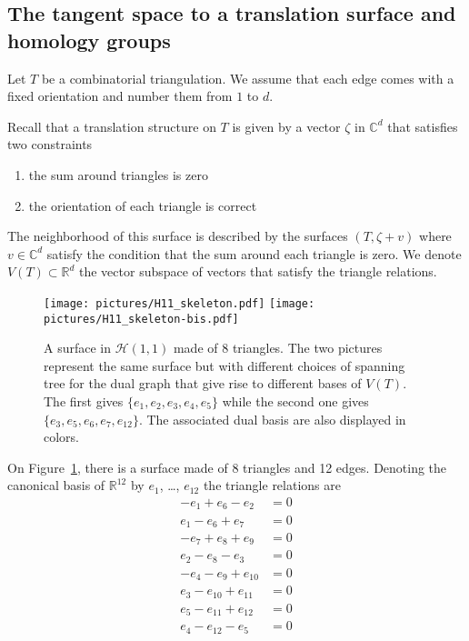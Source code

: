 \documentclass[a4paper,12pt]{article}
\def\bC{\mathbb{C}}
\def\bR{\mathbb{R}}
\def\cH{\mathcal{H}}
\begin{document}
\subsection{The tangent space to a translation surface and homology groups}
Let $T$ be a combinatorial triangulation. We assume that each edge comes with
a fixed orientation and number them from $1$ to $d$.

Recall that a translation structure on $T$ is given by a vector $\zeta$
in $\bC^d$ that satisfies two constraints
\begin{enumerate}
\item the sum around triangles is zero
\item the orientation of each triangle is correct
\end{enumerate}
The neighborhood of this surface is described by the surfaces $(T, \zeta + v)$
where $v \in \bC^d$ satisfy the condition that the sum around each triangle is
zero. We denote $V(T) \subset \bR^d$ the vector subspace of vectors that
satisfy the triangle relations.

\begin{figure}[!ht]
\begin{center}%
\texttt{[image: pictures/H11\_skeleton.pdf]}%
\hspace{1cm}%
\texttt{[image: pictures/H11\_skeleton-bis.pdf]}%
\end{center}
\caption{A surface in $\cH(1,1)$ made of 8 triangles. The two pictures represent the
same surface but with different choices of spanning tree for the dual graph that
give rise to different bases of $V(T)$. The first gives $\{e_1, e_2, e_3, e_4, e_5\}$
while the second one gives $\{e_3, e_5, e_6, e_7, e_{12}\}$. The associated dual basis
are also displayed in colors.}
\label{fig:H11skeleton}
\end{figure}

On Figure~\ref{fig:H11skeleton}, there is a surface made of 8 triangles and
12 edges. Denoting the canonical basis of $\bR^{12}$ by $e_1$, \ldots, $e_{12}$ 
the triangle relations are 
\begin{align*}
-e_1 + e_6 - e_2 &= 0 \\
e_1 - e_6 + e_7 &= 0 \\
-e_7 + e_8 + e_9 &= 0 \\
e_2 - e_8 - e_3 &= 0 \\
-e_4 - e_9 + e_{10} &= 0 \\
e_3 - e_{10} + e_{11} &= 0 \\
e_5 - e_{11} + e_{12} &= 0 \\
e_4 - e_{12} - e_{5} &= 0
\end{align*}
\end{document}
